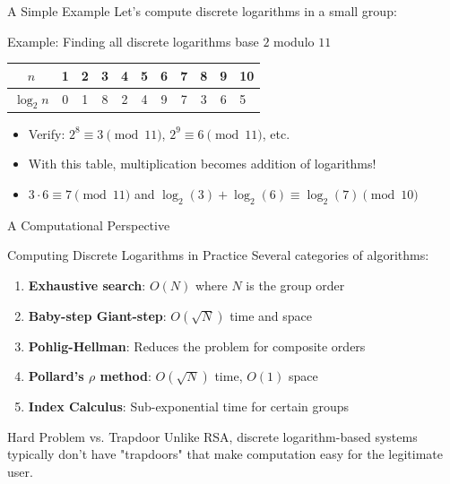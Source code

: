\documentclass[aspectratio=169]{beamer}
\begin{document}
\begin{frame}{A Simple Example}
  Let's compute discrete logarithms in a small group:
  
  \begin{block}{Example: Finding all discrete logarithms base $2$ modulo $11$}
    \begin{center}
      \begin{tabular}{c|ccccccccc}
        $n$ & 1 & 2 & 3 & 4 & 5 & 6 & 7 & 8 & 9 & 10 \\
        \hline
        $\log_2 n$ & 0 & 1 & 8 & 2 & 4 & 9 & 7 & 3 & 6 & 5 \\
      \end{tabular}
    \end{center}
  \end{block}
  
  \begin{itemize}
    \item Verify: $2^8 \equiv 3 \pmod{11}$, $2^9 \equiv 6 \pmod{11}$, etc.
    \item With this table, multiplication becomes addition of logarithms!
    \item $3 \cdot 6 \equiv 7 \pmod{11}$ and $\log_2(3) + \log_2(6) \equiv \log_2(7) \pmod{10}$
  \end{itemize}
\end{frame}

\begin{frame}{A Computational Perspective}
  \begin{block}{Computing Discrete Logarithms in Practice}
    Several categories of algorithms:
  \end{block}
  
  \begin{enumerate}
    \item \textbf{Exhaustive search}: $O(N)$ where $N$ is the group order
    \item \textbf{Baby-step Giant-step}: $O(\sqrt{N})$ time and space
    \item \textbf{Pohlig-Hellman}: Reduces the problem for composite orders
    \item \textbf{Pollard's $\rho$ method}: $O(\sqrt{N})$ time, $O(1)$ space
    \item \textbf{Index Calculus}: Sub-exponential time for certain groups
  \end{enumerate}
  
  \begin{alertblock}{Hard Problem vs. Trapdoor}
    Unlike RSA, discrete logarithm-based systems typically don't have "trapdoors" that make computation easy for the legitimate user.
  \end{alertblock}
\end{frame}
\end{document}
